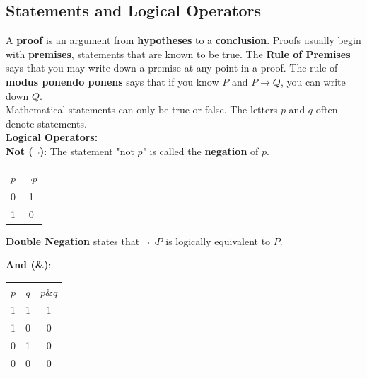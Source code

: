 \documentclass{article}
\begin{document}
    \subsection{Statements and Logical Operators}
    A \textbf{proof} is an argument from \textbf{hypotheses} to a \textbf{conclusion}.
    Proofs usually begin with \textbf{premises}, statements that are known to be true.
    The \textbf{Rule of Premises} says that you may write down a premise at any point in a
    proof. The rule of \textbf{modus ponendo ponens} says that if you know $P$ and
    $P\rightarrow Q$, you can write down $Q$. \\

    \noindent Mathematical statements can only be true or false. The letters $p$ and $q$
    often denote statements. \\

    \noindent \color{purple} \textbf{Logical Operators:} \color{black} \\
    \textbf{Not ($\neg$)}: The statement "not $p$" is called the \textbf{negation} of $p$. \\

    \begin{center}
        \begin{tabular} {|c|c|}
            \hline
            $p$ & $\neg p$ \\
            \hline
            0   & 1        \\
            \hline
            1   & 0        \\
            \hline
        \end{tabular}
    \end{center}

    \noindent \textbf{Double Negation} states that $\neg\neg P$ is logically equivalent to $P$.

    \noindent \textbf{And (\&)}: \\

    \begin{center}
        \begin{tabular} {|c|c|c|}
            \hline
            $p$ & $q$ & $p\& q$ \\
            \hline
            1 & 1 & 1 \\
            \hline
            1 & 0 & 0 \\
            \hline
            0 & 1 & 0 \\
            \hline
            0 & 0 & 0 \\
            \hline
        \end{tabular}
    \end{center}
\end{document}
